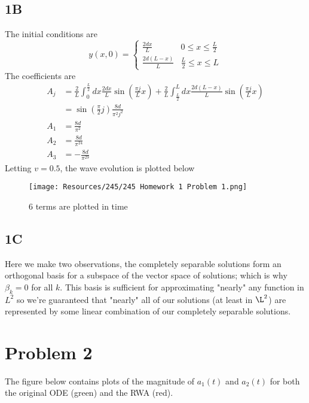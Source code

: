 \subsection*{1B}
The initial conditions are
\begin{equation}
    y(x,0) = \begin{cases}
        \frac{2dx}{L} &0 \leq x \leq \frac{L}{2}\\
        \frac{2d(L-x)}{L} & \frac{L}{2} \leq x \leq L
    \end{cases}
\end{equation}
The coefficients are
\begin{equation}
    \begin{split}
        A_j &= \frac{2}{L}\int_0^{\frac{L}{2}}dx\frac{2dx}{L}\sin(\frac{\pi j}{L}x)+\frac{2}{L}\int_{\frac{L}{2}}^Ldx\frac{2d(L-x)}{L}\sin(\frac{\pi j}{L}x)\\
        &=\sin(\frac{\pi}{2}j)\frac{8d}{\pi^2j^2}\\
        A_1 &= \frac{8d}{\pi^2}\\
        A_2 &= \frac{8d}{\pi^24}\\
        A_3 &= -\frac{8d}{\pi^29}
    \end{split}
\end{equation}
Letting $v=0.5$, the wave evolution is plotted below
\begin{figure}[h]
    \centering
    \texttt{[image: Resources/245/245 Homework 1 Problem 1.png]}
    \caption{$6$ terms are plotted in time}
    \label{fig:initial}
\end{figure}

\subsection*{1C}
Here we make two observations, the completely separable solutions form an orthogonal basis for a subspace of the vector space of solutions; which is why $\beta_k = 0$ for all $k$. This basis is sufficient for approximating "nearly" any function in $L^2$ so we're guaranteed that "nearly" all of our solutions (at least in $\L^2$) are represented by some linear combination of our completely separable solutions.

\pagebreak
\section*{Problem 2}
The figure below contains plots of the magnitude of $a_1(t)$ and $a_2(t)$ for both the original ODE (green) and the RWA (red).

